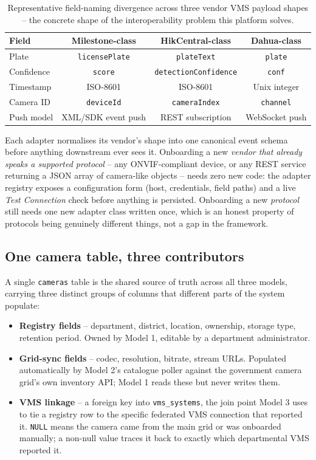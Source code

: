 \documentclass[11pt,a4paper]{article}
\begin{document}
\begin{table}[h]
\centering
\small
\begin{tabular}{lccc}
\toprule
\textbf{Field} & \textbf{Milestone-class} & \textbf{HikCentral-class} & \textbf{Dahua-class} \\
\midrule
Plate & \texttt{licensePlate} & \texttt{plateText} & \texttt{plate} \\
Confidence & \texttt{score} & \texttt{detectionConfidence} & \texttt{conf} \\
Timestamp & ISO-8601 & ISO-8601 & Unix integer \\
Camera ID & \texttt{deviceId} & \texttt{cameraIndex} & \texttt{channel} \\
Push model & XML/SDK event push & REST subscription & WebSocket push \\
\bottomrule
\end{tabular}
\caption{Representative field-naming divergence across three vendor VMS payload shapes -- the concrete shape of the interoperability problem this platform solves.}
\label{tab:vendor-shapes}
\end{table}

Each adapter normalises its vendor's shape into one canonical event schema
before anything downstream ever sees it. Onboarding a new \emph{vendor that
already speaks a supported protocol} -- any ONVIF-compliant device, or any
REST service returning a JSON array of camera-like objects -- needs zero
new code: the adapter registry exposes a configuration form (host,
credentials, field paths) and a live \emph{Test Connection} check before
anything is persisted. Onboarding a new \emph{protocol} still needs one new
adapter class written once, which is an honest property of protocols being
genuinely different things, not a gap in the framework.

\subsection{One camera table, three contributors}

A single \texttt{cameras} table is the shared source of truth across all
three models, carrying three distinct groups of columns that different
parts of the system populate:

\begin{itemize}
\item \textbf{Registry fields} -- department, district, location, ownership,
  storage type, retention period. Owned by Model 1, editable by a
  department administrator.
\item \textbf{Grid-sync fields} -- codec, resolution, bitrate, stream URLs.
  Populated automatically by Model 2's catalogue poller against the
  government camera grid's own inventory API; Model 1 reads these but never
  writes them.
\item \textbf{VMS linkage} -- a foreign key into \texttt{vms\_systems}, the
  join point Model 3 uses to tie a registry row to the specific federated
  VMS connection that reported it. \texttt{NULL} means the camera came from
  the main grid or was onboarded manually; a non-null value traces it back
  to exactly which departmental VMS reported it.
\end{itemize}
\end{document}
